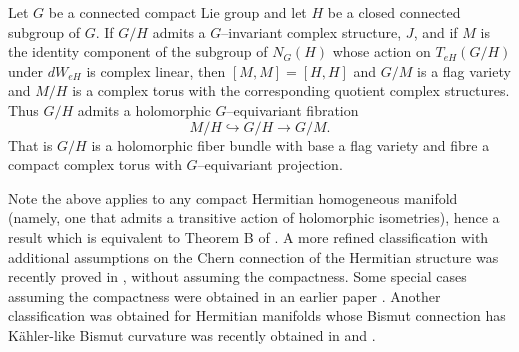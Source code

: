 \documentclass{amse-new}
\numberwithin{equation}{section} %
\begin{document}
\begin{theorem}
\label{gen-Wang} Let $G$ be a connected compact Lie group and let $H$ be a
closed connected subgroup of $G$. If $G/H$ admits a $G$--invariant complex
structure, $J$, and if $M$ is the identity component of the subgroup of
$N_{G}(H)$ whose action on $T_{eH}(G/H)$ under $dW_{eH}$ is complex linear,
then $[M,M]=[H,H]$ and $G/M$ is a flag variety and $M/H$ is a complex torus
with the corresponding quotient complex structures. Thus $G/H$ admits a
holomorphic $G $--equivariant fibration
\[
M/H\hookrightarrow G/H\rightarrow G/M.
\]
That is $G/H$ is a holomorphic fiber bundle with base a flag variety and fibre
a compact complex torus with $G$--equivariant projection.
\end{theorem}

Note the above applies to any compact Hermitian homogeneous manifold (namely,
one that admits a transitive action of holomorphic isometries), hence a result which is equivalent to Theorem B of \cite{HK}. A more refined
classification with additional assumptions on the Chern connection of the
Hermitian structure was recently proved in \cite{NZ2}, without assuming the
compactness. Some special cases assuming the compactness were obtained in an
earlier paper \cite{NZ1}. Another classification was obtained for Hermitian manifolds whose Bismut connection has K\"ahler-like Bismut curvature was recently obtained in \cite{BPT} and \cite{ZZ}.
\end{document}
